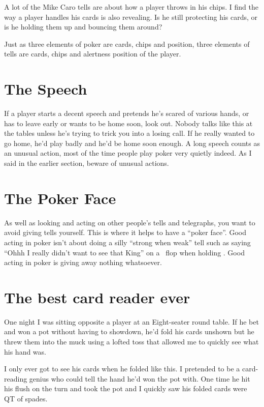 A lot of the Mike Caro tells are about how a player
throws in his chips. I find the way a player
handles his cards is also revealing. Is he still protecting
his cards, or is he holding them up and bouncing them around?

Just as three elements of poker are cards, chips and position,
three elements of tells are cards, chips and alertness position
of the player.

\section{The Speech}

If a player starts a decent speech and pretends he's scared of various
hands, or has to leave early or wants to be home soon, look out.
Nobody talks like this at the tables unless he's trying to trick
you into a losing call. If he really wanted to go home, he'd play
badly and he'd be home soon enough. A long speech counts as an unusual
action, most of the time people play poker very quietly indeed. As I
said in the earlier section, beware of unusual actions.

\section{The Poker Face}

As well as looking and acting on other people's tells and telegraphs,
you want to avoid giving tells yourself. This is where it helps
to have a ``poker face''. Good acting in poker isn't about doing
a silly ``strong when weak'' tell such as saying ``Ohhh I really
didn't want to see that King'' on a \Kh\Qd\eigc\ flop when holding \Ks\Kc.
Good acting in poker is giving away nothing whatsoever.

\section{The best card reader ever}

One night I was sitting opposite a player at an Eight-seater round
table. If he bet and won a pot without having to showdown, he'd
fold his cards unshown but he threw them into the muck using a lofted toss
that allowed me to quickly see what his hand was.

I only ever got to see his cards when he folded like this. I pretended
to be a card-reading genius who could tell the hand he'd won the pot
with. One time he hit his flush on the turn and took the pot and I
quickly saw his folded cards were QT of spades.

